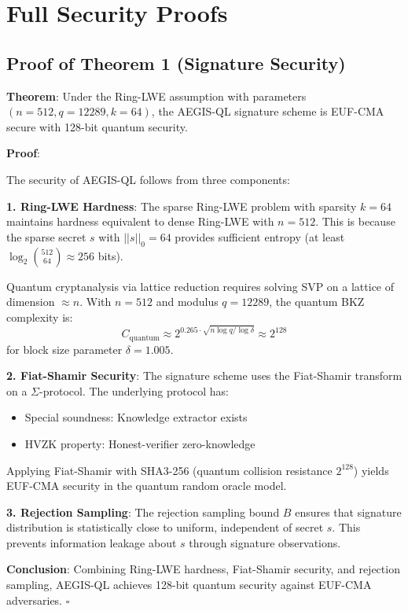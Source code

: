 \documentclass[11pt,a4paper]{article}
\begin{document}
\appendix

\section{Full Security Proofs}

\subsection{Proof of Theorem 1 (Signature Security)}

\textbf{Theorem}: Under the Ring-LWE assumption with parameters $(n=512, q=12289, k=64)$, the AEGIS-QL signature scheme is EUF-CMA secure with 128-bit quantum security.

\textbf{Proof}:

The security of AEGIS-QL follows from three components:

\textbf{1. Ring-LWE Hardness}: The sparse Ring-LWE problem with sparsity $k=64$ maintains hardness equivalent to dense Ring-LWE with $n=512$. This is because the sparse secret $s$ with $||s||_0 = 64$ provides sufficient entropy (at least $\log_2 \binom{512}{64} \approx 256$ bits).

Quantum cryptanalysis via lattice reduction requires solving SVP on a lattice of dimension $\approx n$. With $n=512$ and modulus $q=12289$, the quantum BKZ complexity is:
$$C_{\text{quantum}} \approx 2^{0.265 \cdot \sqrt{n \log q / \log \delta}} \approx 2^{128}$$
for block size parameter $\delta = 1.005$.

\textbf{2. Fiat-Shamir Security}: The signature scheme uses the Fiat-Shamir transform on a $\Sigma$-protocol. The underlying protocol has:
\begin{itemize}
    \item Special soundness: Knowledge extractor exists
    \item HVZK property: Honest-verifier zero-knowledge
\end{itemize}

Applying Fiat-Shamir with SHA3-256 (quantum collision resistance $2^{128}$) yields EUF-CMA security in the quantum random oracle model.

\textbf{3. Rejection Sampling}: The rejection sampling bound $B$ ensures that signature distribution is statistically close to uniform, independent of secret $s$. This prevents information leakage about $s$ through signature observations.

\textbf{Conclusion}: Combining Ring-LWE hardness, Fiat-Shamir security, and rejection sampling, AEGIS-QL achieves 128-bit quantum security against EUF-CMA adversaries. $\square$
\end{document}
